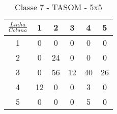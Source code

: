 \begin{table}[]
\centering
\caption{Classe 7 - TASOM - 5x5}
\label{my-label}
\begin{tabular}{|c|ccccc|}
\hline
\rowcolor[HTML]{FFFFFF} 
$\frac{Linha}{Coluna}$    & \multicolumn{1}{c|}{\cellcolor[HTML]{FFFFFF}1} & \multicolumn{1}{c|}{\cellcolor[HTML]{FFFFFF}2} & \multicolumn{1}{c|}{\cellcolor[HTML]{FFFFFF}3} & \multicolumn{1}{c|}{\cellcolor[HTML]{FFFFFF}4} & 5  \\ \hline
\rowcolor[HTML]{FFFFFF} 
1                         & 0                                              & 0                                              & 0                                              & 0                                              & 0  \\ \cline{1-1}
\rowcolor[HTML]{FFFFFF} 
2                         & 0                                              & \cellcolor[HTML]{34CDF9}24                     & 0                                              & 0                                              & 0  \\ \cline{1-1}
\rowcolor[HTML]{34CDF9} 
\cellcolor[HTML]{FFFFFF}3 & \cellcolor[HTML]{FFFFFF}0                      & 56                                             & 12                                             & 40                                             & 26 \\ \cline{1-1}
\rowcolor[HTML]{FFFFFF} 
4                         & \cellcolor[HTML]{34CDF9}12                     & 0                                              & 0                                              & 3                                              & 0  \\ \cline{1-1}
\rowcolor[HTML]{FFFFFF} 
5                         & 0                                              & 0                                              & 0                                              & 5                                              & 0  \\ \hline
\end{tabular}
\end{table}



